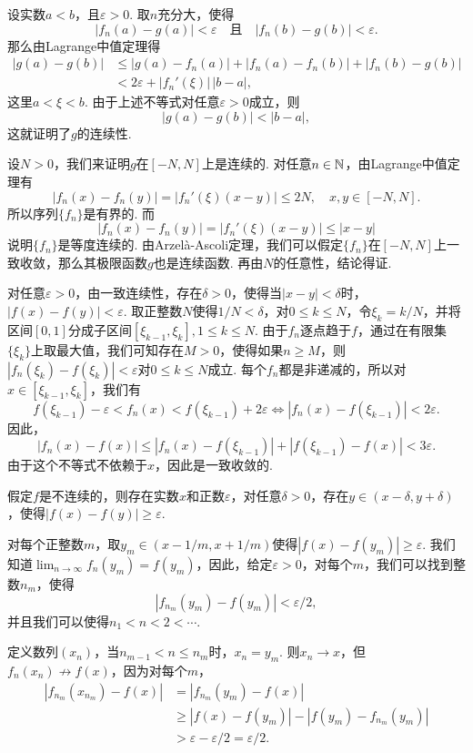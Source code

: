 \begin{ans}
  \method 设实数$a<b$，且$\varepsilon>0$. 取$n$充分大，使得
  \[
    |f_n(a)-g(a)|<\varepsilon \quad \text{且} \quad
    |f_n(b)-g(b)|<\varepsilon.
  \]
  那么由Lagrange中值定理得
  \begin{align*}
    |g(a)-g(b)| & \le |g(a)-f_n(a)|+|f_n(a)-f_n(b)|
                  + |f_n(b)-g(b)|\\
    & < 2\varepsilon + |f_n'(\xi)|\,|b-a|,
  \end{align*}
  这里$a<\xi<b$. 由于上述不等式对任意$\varepsilon>0$成立，则
  \[ |g(a)-g(b)|<|b-a|, \]
  这就证明了$g$的连续性.

  \method 设$N>0$，我们来证明$g$在$[-N,N]$上是连续的. 对任意$n\in\mathbb N$，由Lagrange中值定理有
  \[
    |f_n(x) -f_n(y)|=|f_n'(\xi)(x-y)|\le 2N,\quad x,y\in[-N,N].
  \]
  所以序列$\{f_n\}$是有界的. 而
  \[
    |f_n(x)-f_n(y)|=|f_n'(\xi)(x-y)|\le|x-y|
  \]
  说明$\{f_n\}$是等度连续的. 由Arzel\`a-Ascoli定理，我们可以假定$\{f_n\}$在$[-N,N]$上一致收敛，那么其极限函数$g$也是连续函数. 再由$N$的任意性，结论得证.
\end{ans}

\begin{ans}
  对任意$\varepsilon>0$，由一致连续性，存在$\delta>0$，使得当$|x-y|<\delta$时，$|f(x)-f(y)|<\varepsilon$. 取正整数$N$使得$1/N<\delta$，对$0\le k\le N$，令$\xi_k=k/N$，并将区间$[0,1]$分成子区间$[\xi_{k-1},\xi_k],1\le k\le N$. 由于$f_n$逐点趋于$f$，通过在有限集$\{\xi_k\}$上取最大值，我们可知存在$M>0$，使得如果$n\ge M$，则$|f_n(\xi_k)-f(\xi_k)|<\varepsilon$对$0\le k\le N$成立. 每个$f_n$都是非递减的，所以对$x\in[\xi_{k-1},\xi_k]$，我们有
  \[
    f(\xi_{k-1})-\varepsilon< f_n(x)<f(\xi_{k-1})+2\varepsilon
    \Longleftrightarrow|f_n(x)-f(\xi_{k-1})|<2\varepsilon.
  \]
  因此，
  \[
    |f_n(x)-f(x)|\le |f_n(x)-f(\xi_{k-1})|
    + |f(\xi_{k-1})-f(x)| < 3\varepsilon.
  \]
  由于这个不等式不依赖于$x$，因此是一致收敛的.
\end{ans}

\begin{ans}
  假定$f$是不连续的，则存在实数$x$和正数$\varepsilon$，对任意$\delta>0$，存在$y\in(x-\delta,y+\delta)$，使得$|f(x)-f(y)|\ge\varepsilon$.

  对每个正整数$m$，取$y_m\in(x-1/m,x+1/m)$使得$|f(x)-f(y_m)|\ge\varepsilon$. 我们知道$\lim_{n\to\infty}f_n(y_m)=f(y_m)$，因此，给定$\varepsilon>0$，对每个$m$，我们可以找到整数$n_m$，使得
  \[ |f_{n_m}(y_m)-f(y_m)| <\varepsilon/2, \]
  并且我们可以使得$n_1<n<2<\cdots$.

  定义数列$(x_n)$，当$n_{m-1}<n\le n_m$时，$x_n=y_m$. 则$x_n\to x$，但$f_n(x_n)\not\to f(x)$，因为对每个$m$，
  \begin{align*}
    |f_{n_m}(x_{n_m})-f(x)| & = |f_{n_m}(y_m)-f(x)|\\
    & \ge |f(x)-f(y_m)| - |f(y_m)-f_{n_m}(y_m)|\\
    & > \varepsilon - \varepsilon/2=\varepsilon/2.
  \end{align*}
\end{ans}

